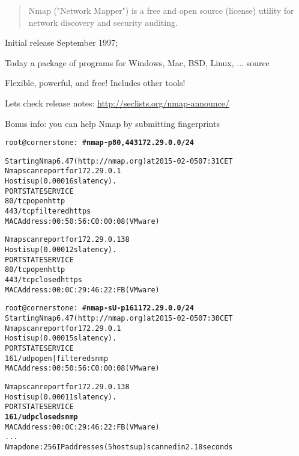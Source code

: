 \documentclass[Screen16to9,17pt]{foils}
\begin{document}
\begin{quote}
Nmap ("Network Mapper") is a free and open source (license) utility for network discovery and security auditing.
\end{quote}

\begin{list1}
\item Initial release September 1997;
\item Today a package of programs for Windows, Mac, BSD, Linux, ... source
\item Flexible, powerful, and free! Includes other tools!
\item Lets check release notes: \url{http://seclists.org/nmap-announce/}
\end{list1}

Bonus info: you can help Nmap by submitting fingerprints



\begin{alltt}\small
root@cornerstone:~#{\bfseries  nmap -p80,443 172.29.0.0/24}

Starting Nmap 6.47 ( http://nmap.org ) at 2015-02-05 07:31 CET
Nmap scan report for 172.29.0.1
Host is up (0.00016s latency).
PORT    STATE    SERVICE
{\color{darkgreen}80/tcp  open     http}
443/tcp filtered https
MAC Address: 00:50:56:C0:00:08 (VMware)

Nmap scan report for 172.29.0.138
Host is up (0.00012s latency).
PORT    STATE  SERVICE
{\color{darkgreen}80/tcp  open   http}
443/tcp closed https
MAC Address: 00:0C:29:46:22:FB (VMware)

\end{alltt}


\begin{alltt}\small
root@cornerstone:~#{\bfseries nmap -sU -p 161 172.29.0.0/24}
Starting Nmap 6.47 ( http://nmap.org ) at 2015-02-05 07:30 CET
Nmap scan report for 172.29.0.1
Host is up (0.00015s latency).
PORT    STATE         SERVICE
{\color{darkgreen}161/udp open|filtered snmp}
MAC Address: 00:50:56:C0:00:08 (VMware)

Nmap scan report for 172.29.0.138
Host is up (0.00011s latency).
PORT    STATE  SERVICE
{\bf{161/udp closed snmp}}
MAC Address: 00:0C:29:46:22:FB (VMware)
...
Nmap done: 256 IP addresses (5 hosts up) scanned in 2.18 seconds
\end{alltt}
\end{document}
